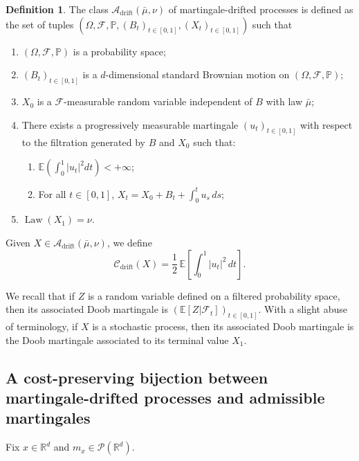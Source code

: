 \documentclass[reqno, a4paper]{amsart}
\theoremstyle{plain}
\theoremstyle{definition}
\newtheorem{definition}[theorem]{Definition}
\theoremstyle{remark}
\numberwithin{equation}{section}
\numberwithin{theorem}{section}
\newcommand{\R}{\mathbb{R}}
\newcommand{\E}{\mathbb{E}}
\newcommand{\Law}{\operatorname{Law}}
\newcommand{\PP}{\mathcal{P}}
\begin{document}
	\begin{definition}\label{def:class_drift}
		The class $\mathcal A_{\mathrm{drift}}(\bar{\mu},\nu)$ of martingale-drifted processes is defined as the set of tuples 
		$(\Omega,\mathcal F,\mathbb P,(B_t)_{t \in [0,1]},(X_t)_{t \in [0,1]})$ such that 
		\begin{enumerate}
			\item $(\Omega,\mathcal{F},\mathbb{P})$ is a probability space;
			\item $(B_t)_{t \in [0,1]}$ is a $d$-dimensional standard Brownian motion on $(\Omega,\mathcal{F},\mathbb{P})$;
			\item $X_0$ is a $\mathcal F$-measurable random variable independent of $B$ with law $\bar\mu$;
			\item\label{point:condition_drift} There exists a progressively measurable martingale  $(u_t)_{t\in[0,1]}$ with respect to the filtration generated by $B$ and $X_0$ such that: 
			\begin{enumerate}
				\item $\E\left(\int_0^1 |u_t|^2 dt\right) < + \infty$;
				\item\label{eq:deco_drift}  For all $t \in [0,1]$, $X_t = X_0+ B_t + \int_0^t u_s\,ds$;
			\end{enumerate}
			\item\label{point:law_drift} $\Law(X_1) = \nu.$
		\end{enumerate}
		Given $X \in \mathcal A_{\mathrm{drift}}(\bar\mu,\nu)$, we define 
		\begin{equation*}
			\mathcal C_{\mathrm{drift}}(X)
			=\frac12\,\mathbb E\!\left[\int_0^1 |u_t|^2\,dt\right].
		\end{equation*}
	\end{definition}
	
	We recall that if $Z$ is a random variable defined on a filtered probability space, then its associated Doob martingale is $(\mathbb E[Z|\mathcal F_t])_{t\in[0,1]}$. With a slight abuse of terminology, if $X$ is a stochastic process, then its associated Doob martingale is the Doob martingale associated to its terminal value $X_1$. 
	
	\subsection{A cost-preserving bijection between martingale-drifted processes and admissible martingales}
	
	
	Fix $x \in \R^d$ and $m_x \in \PP(\R^d)$.
	
\end{document}
